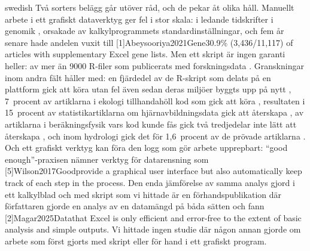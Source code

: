 \begin{onlyin}{swedish}
Två sorters belägg går utöver råd, och de pekar åt olika håll.  Manuellt
arbete i ett grafiskt dataverktyg ger fel i stor skala: i ledande
tidskrifter i genomik
, orsakade av kalkylprogrammets standardinställningar, och
fem år senare hade andelen vuxit till
[1]{Abeysooriya2021Gene}{30.9\%
(3,436/11,117) of articles with supplementary Excel gene lists}.  Men
ett skript är ingen garanti heller: av mer än 9000 R-filer som
publicerats med forskningsdata
.  Granskningar inom andra fält håller med:
en fjärdedel av de R-skript som delats på en plattform gick att köra
utan fel även sedan deras miljöer byggts upp på nytt
\autocite{Saju2025Computational}, 7~procent av artiklarna i ekologi
tillhandahöll kod som gick att köra \autocite{Kellner2024Functional},
resultaten i 15~procent av statistikartiklarna om hjärnavbildningsdata
gick att återskapa \autocite{Xiong2022State}, av artiklarna i
beräkningsfysik vars kod kunde fås gick två tredjedelar inte lätt att
återskapa \autocite{Stodden2018Enabling}, och inom hydrologi gick det
för 1,6~procent av de prövade artiklarna
\autocite{Stagge2019Assessing}.  Och ett grafiskt verktyg kan föra den
logg som gör arbete upprepbart: \enquote{good enough}-praxisen nämner
verktyg för datarensning som
[5]{Wilson2017Good}{provide a graphical user
interface but also automatically keep track of each step in the
process}.  Den enda jämförelse av samma analys gjord i ett kalkylblad och
med skript som vi hittade är en förhandspublikation där författaren
gjorde en analys av en datamängd på båda sätten och fann
[2]{Magar2025Data}{that Excel is only efficient
and error-free to the extent of basic analysis and simple outputs}.  Vi
hittade ingen studie där någon annan gjorde om arbete som först gjorts
med skript eller för hand i ett grafiskt program.


\end{onlyin}
